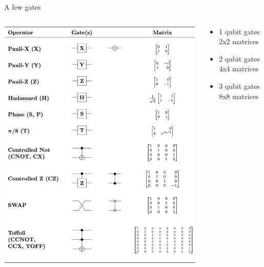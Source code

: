 \documentclass[11p,aspectratio=169]{beamer}
\begin{document}
\begin{frame}{A few gates}
    \begin{columns}
        \begin{column}{0.5 \textwidth}
            \includegraphics[height = 0.8 \textheight]{figures/gates.png}
        \end{column}
        \begin{column}{0.5 \textwidth}
            \begin{itemize}
                \item 1 qubit gates 2x2 matrices
                \item 2 qubit gates 4x4 matrices
                \item 3 qubit gates 8x8 matrices
            \end{itemize}
        \end{column}
    \end{columns}

\end{frame}
\end{document}
